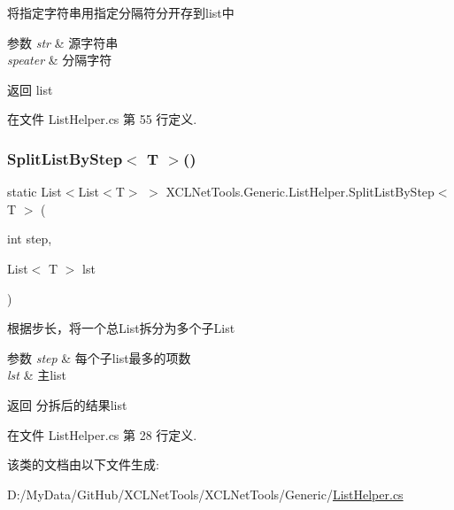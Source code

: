 将指定字符串用指定分隔符分开存到list中 


\begin{DoxyParams}{参数}
{\em str} & 源字符串\\
\hline
{\em speater} & 分隔字符\\
\hline
\end{DoxyParams}
\begin{DoxyReturn}{返回}
list
\end{DoxyReturn}


在文件 List\+Helper.\+cs 第 55 行定义.

\mbox{\label{class_x_c_l_net_tools_1_1_generic_1_1_list_helper_a38adb871b8752fb797795645625b7b4f}} 
\subsubsection{\texorpdfstring{Split\+List\+By\+Step$<$ T $>$()}{SplitListByStep< T >()}}
{\footnotesize\ttfamily static List$<$List$<$T$>$ $>$ X\+C\+L\+Net\+Tools.\+Generic.\+List\+Helper.\+Split\+List\+By\+Step$<$ T $>$ (\begin{DoxyParamCaption}\item[{int}]{step,  }\item[{List$<$ T $>$}]{lst }\end{DoxyParamCaption})\hspace{0.3cm}{\ttfamily [static]}}



根据步长，将一个总\+List拆分为多个子\+List 


\begin{DoxyParams}{参数}
{\em step} & 每个子list最多的项数\\
\hline
{\em lst} & 主list\\
\hline
\end{DoxyParams}
\begin{DoxyReturn}{返回}
分拆后的结果list
\end{DoxyReturn}


在文件 List\+Helper.\+cs 第 28 行定义.



该类的文档由以下文件生成\+:\begin{DoxyCompactItemize}
\item 
D\+:/\+My\+Data/\+Git\+Hub/\+X\+C\+L\+Net\+Tools/\+X\+C\+L\+Net\+Tools/\+Generic/\hyperlink{_list_helper_8cs}{List\+Helper.\+cs}\end{DoxyCompactItemize}
